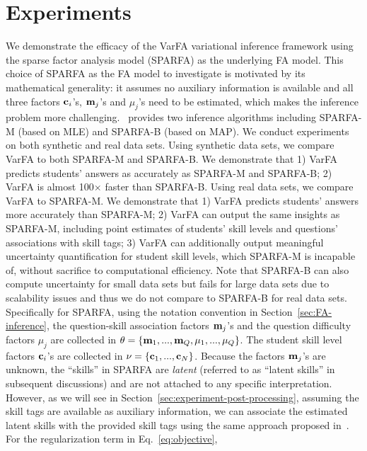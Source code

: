 \section{Experiments}
\label{sec:experiments}
%
We demonstrate the efficacy of the VarFA variational inference framework using the
sparse factor analysis model (SPARFA) as the underlying FA model.
%
This choice of SPARFA as the FA model to investigate is motivated by its
mathematical generality: it assumes no auxiliary information is available and
all three factors ${\mathbf{c}}_i$'s, ${\mathbf{m}}_j$'s and $\mu_j$'s need to be estimated,
which makes the inference problem more challenging.~\cite{lan14a} provides two
inference algorithms including SPARFA-M (based on MLE) and SPARFA-B (based on
MAP).
%
We conduct experiments on both synthetic and real data sets. Using synthetic
data sets, we compare VarFA to both SPARFA-M and SPARFA-B. We demonstrate that
1) VarFA predicts students' answers as accurately as SPARFA-M and SPARFA-B; 2)
VarFA is almost 100$\times$ faster than SPARFA-B. Using real data sets, we
compare VarFA to SPARFA-M. We demonstrate that 1) VarFA predicts students'
answers more accurately than SPARFA-M; 2) VarFA can output the same insights as
SPARFA-M, including point estimates of students' skill levels and questions'
associations with skill tags;
3) VarFA can additionally output meaningful uncertainty quantification for student skill levels, which SPARFA-M is incapable of, without sacrifice to computational efficiency. Note that SPARFA-B can also compute uncertainty for small data sets but fails for large data sets due to scalability issues and thus we do not compare to SPARFA-B for real data sets.
%
Specifically for SPARFA, using the notation convention in
Section~\ref{sec:FA-inference}, the question-skill association factors
${\mathbf{m}}_j$'s and the question difficulty factors $\mu_j$ are collected in $\theta
    = \{{\mathbf{m}}_1,...,{\mathbf{m}}_Q,\mu_1,...,\mu_Q\}$. The student skill level factors
${\mathbf{c}}_i$'s are collected in $\nu = \{{\mathbf{c}}_1,...,{\mathbf{c}}_N\}$. Because the factors
${\mathbf{m}}_j$'s are unknown, the ``skills'' in SPARFA are \textit{latent} (referred
to as ``latent skills'' in subsequent discussions) and are not attached to any
specific interpretation. However, as we will see in
Section~\ref{sec:experiment-post-processing}, assuming the skill tags are
available as auxiliary information, we can associate the estimated latent
skills with the provided skill tags using the same approach proposed
in~\cite{lan14a}. For the regularization term in Eq.~\ref{eq:objective},
